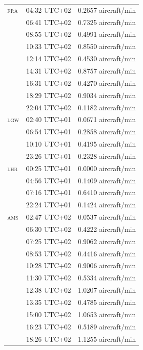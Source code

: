 \documentclass[]{elsarticle}
\newcommand{\airp}[1]{\textcolor{#1}{\textsc{#1}}}
\begin{document}
\begin{center}
\begin{longtable}{lll}
      \airp{fra} & 04:32 UTC+02 &  0.2657 aircraft/min \\
           & 06:41 UTC+02 &  0.7325 aircraft/min \\
           & 08:55 UTC+02 &  0.4991 aircraft/min \\
           & 10:33 UTC+02 &  0.8550 aircraft/min \\
           & 12:14 UTC+02 &  0.4530 aircraft/min \\
           & 14:31 UTC+02 &  0.8757 aircraft/min \\
           & 16:31 UTC+02 &  0.4270 aircraft/min \\
           & 18:29 UTC+02 &  0.9034 aircraft/min \\
           & 22:04 UTC+02 &  0.1182 aircraft/min \\
      \airp{lgw} & 02:40 UTC+01 &  0.0671 aircraft/min \\
           & 06:54 UTC+01 &  0.2858 aircraft/min \\
           & 10:10 UTC+01 &  0.4195 aircraft/min \\
           & 23:26 UTC+01 &  0.2328 aircraft/min \\
      \airp{lhr} & 00:25 UTC+01 &  0.0000 aircraft/min \\
           & 04:56 UTC+01 &  0.1409 aircraft/min \\
           & 07:16 UTC+01 &  0.6410 aircraft/min \\
           & 22:24 UTC+01 &  0.1424 aircraft/min \\
      \airp{ams} & 02:47 UTC+02 &  0.0537 aircraft/min \\
           & 06:30 UTC+02 &  0.4222 aircraft/min \\
           & 07:25 UTC+02 &  0.9062 aircraft/min \\
           & 08:53 UTC+02 &  0.4416 aircraft/min \\
           & 10:28 UTC+02 &  0.9006 aircraft/min \\
           & 11:30 UTC+02 &  0.5334 aircraft/min \\
           & 12:38 UTC+02 &  1.0207 aircraft/min \\
           & 13:35 UTC+02 &  0.4785 aircraft/min \\
           & 15:00 UTC+02 &  1.0653 aircraft/min \\
           & 16:23 UTC+02 &  0.5189 aircraft/min \\
           & 18:26 UTC+02 &  1.1255 aircraft/min \\

\end{longtable}
\end{center}
\end{document}
